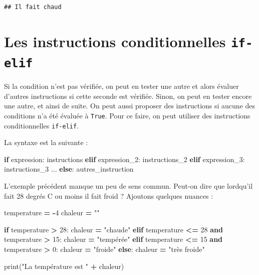 \documentclass[12pt,]{book}
\newenvironment{Shaded}{\begin{snugshade}}{\end{snugshade}}
\newcommand{\KeywordTok}[1]{\textcolor[rgb]{0.13,0.29,0.53}{\textbf{#1}}}
\newcommand{\DecValTok}[1]{\textcolor[rgb]{0.00,0.00,0.81}{#1}}
\newcommand{\StringTok}[1]{\textcolor[rgb]{0.31,0.60,0.02}{#1}}
\newcommand{\ControlFlowTok}[1]{\textcolor[rgb]{0.13,0.29,0.53}{\textbf{#1}}}
\newcommand{\OperatorTok}[1]{\textcolor[rgb]{0.81,0.36,0.00}{\textbf{#1}}}
\newcommand{\BuiltInTok}[1]{#1}
\newcommand{\NormalTok}[1]{#1}
\numberwithin{equation}{section}
\numberwithin{countremarque}{section}
\begin{document}
\begin{lstlisting}
## Il fait chaud
\end{lstlisting}

\section{\texorpdfstring{Les instructions conditionnelles
\texttt{if-elif}}{Les instructions conditionnelles if-elif}}\label{les-instructions-conditionnelles-if-elif}

Si la condition n'est pas vérifiée, on peut en tester une autre et alors
évaluer d'autres instructions si cette seconde est vérifiée. Sinon, on
peut en tester encore une autre, et ainsi de suite. On peut aussi
proposer des instructions si aucune des conditions n'a été évaluée à
\texttt{True}. Pour ce faire, on peut utiliser des instructions
conditionnelles \texttt{if-elif}.

La syntaxe est la suivante :

\begin{Shaded}
\begin{Highlighting}[]
\ControlFlowTok{if}\NormalTok{ expression:}
\NormalTok{  instructions}
\ControlFlowTok{elif}\NormalTok{ expression_2:}
\NormalTok{  instructions_2}
\ControlFlowTok{elif}\NormalTok{ expression_3:}
\NormalTok{  instructions_3}
\NormalTok{...}
\ControlFlowTok{else}\NormalTok{:}
\NormalTok{  autres_instruction}
\end{Highlighting}
\end{Shaded}

L'exemple précédent manque un peu de sens commun. Peut-on dire que
lordqu'il fait 28 degrés C ou moins il fait froid ? Ajoutons quelques
nuances :

\begin{Shaded}
\begin{Highlighting}[]
\NormalTok{temperature }\OperatorTok{=} \OperatorTok{-}\DecValTok{4}
\NormalTok{chaleur }\OperatorTok{=} \StringTok{""}

\ControlFlowTok{if}\NormalTok{ temperature }\OperatorTok{>} \DecValTok{28}\NormalTok{:}
\NormalTok{  chaleur }\OperatorTok{=} \StringTok{"chaude"}
\ControlFlowTok{elif}\NormalTok{ temperature }\OperatorTok{<=} \DecValTok{28} \KeywordTok{and}\NormalTok{ temperature }\OperatorTok{>} \DecValTok{15}\NormalTok{:}
\NormalTok{  chaleur }\OperatorTok{=} \StringTok{"tempérée"}
\ControlFlowTok{elif}\NormalTok{ temperature }\OperatorTok{<=} \DecValTok{15} \KeywordTok{and}\NormalTok{ temperature }\OperatorTok{>} \DecValTok{0}\NormalTok{:}
\NormalTok{  chaleur }\OperatorTok{=} \StringTok{"froide"}
\ControlFlowTok{else}\NormalTok{:}
\NormalTok{  chaleur }\OperatorTok{=} \StringTok{"très froide"}

\BuiltInTok{print}\NormalTok{(}\StringTok{"La température est "} \OperatorTok{+}\NormalTok{ chaleur)}
\end{Highlighting}
\end{Shaded}
\end{document}
